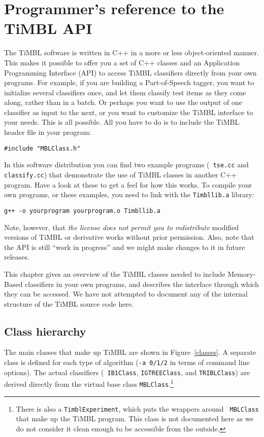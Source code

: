 \documentclass{report}
\begin{document}
\chapter{Programmer's reference to the TiMBL API}
\label{programmers}

The TiMBL software is written in C++ in a more or less object-oriented
manner. This makes it possible to offer you a set of C++ classes and
an Application Programming Interface (API) to access TiMBL classifiers
directly from your own programs. For example, if you are building a
Part-of-Speech tagger, you want to initialize several classifiers
once, and let them classify test items as they come along, rather than
in a batch. Or perhaps you want to use the output of one classifier as
input to the next, or you want to customize the TiMBL interface to
your needs. This is all possible. All you have to do is to include the
TiMBL header file in your program:

\begin{verbatim}
#include "MBLClass.h"
\end{verbatim}

\noindent
In this software distribution you can find two example programs ({\tt
tse.cc} and {\tt classify.cc}) that demonstrate the use of TiMBL
classes in another C++ program. Have a look at these to get a feel for
how this works. To compile your own programs, or these examples, you
need to link with the {\tt Timbllib.a} library:

\begin{verbatim}
g++ -o yourprogram yourprogram.o Timbllib.a
\end{verbatim}

\noindent
Note, however, that {\em the license does not permit you to
redistribute} modified versions of TiMBL or derivative works without
prior permission. Also, note that the API is still ``work in
progress'' and we might make changes to it in future releases.

This chapter gives an overview of the TiMBL classes needed to include
Memory-Based classifiers in your own programs, and describes the
interface through which they can be accessed. We have not attempted to
document any of the internal structure of the TiMBL source code here.

\section{Class hierarchy}
\label{classhierarchsection}

The main classes that make up TiMBL are shown in Figure~\ref{classes}.
A separate class is defined for each type of algorithm ({\tt -a 0/1/2}
in terms of command line options). The actual classifiers ({\tt
IB1Class}, {\tt IGTREEClass}, and {\tt TRIBLClass}) are derived
directly from the virtual base class {\tt MBLClass}.\footnote{There is
also a {\tt TimblExperiment}, which puts the wrappers around {\tt
MBLClass} that make up the TiMBL program. This class is not documented
here as we do not consider it clean enough to be accessible from the
outside.}
\end{document}
